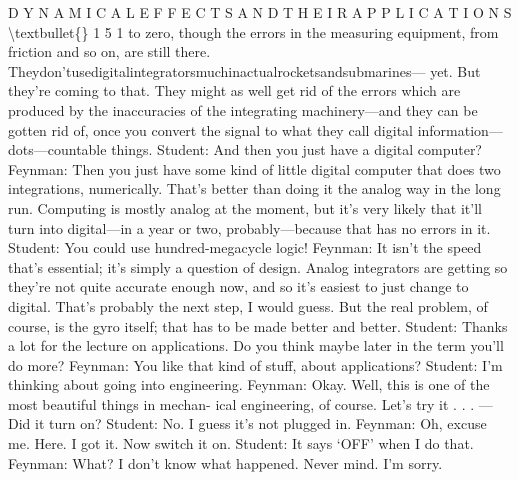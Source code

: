 \documentclass[10pt,oneside]{article}
\begin{document}
D Y N A M I C A L  E F F E C T S  A N D  T H E I R  A P P L I C A T I O N S \textbackslash{}textbullet\{\} 1 5 1 to zero, though the errors in the measuring equipment, from friction and so on, are still there. Theydon’tusedigitalintegratorsmuchinactualrocketsandsubmarines--- yet. But they’re coming to that. They might as well get rid of the errors which are produced by the inaccuracies of the integrating machinery---and they can be gotten rid of, once you convert the signal to what they call digital information---dots---countable things. Student: And then you just have a digital computer? Feynman: Then you just have some kind of little digital computer that does two integrations, numerically. That’s better than doing it the analog way in the long run. Computing is mostly analog at the moment, but it’s very likely that it’ll turn into digital---in a year or two, probably---because that has no errors in it. Student: You could use hundred-megacycle logic! Feynman: It isn’t the speed that’s essential; it’s simply a question of design. Analog integrators are getting so they’re not quite accurate enough now, and so it’s easiest to just change to digital. That’s probably the next step, I would guess. But the real problem, of course, is the gyro itself; that has to be made better and better. Student: Thanks a lot for the lecture on applications. Do you think maybe later in the term you’ll do more? Feynman: You like that kind of stuff, about applications? Student: I’m thinking about going into engineering. Feynman: Okay. Well, this is one of the most beautiful things in mechan- ical engineering, of course. Let’s try it . . . ---Did it turn on? Student: No. I guess it’s not plugged in. Feynman: Oh, excuse me. Here. I got it. Now switch it on. Student: It says ‘OFF’ when I do that. Feynman: What? I don’t know what happened. Never mind. I’m sorry.\par
\end{document}
